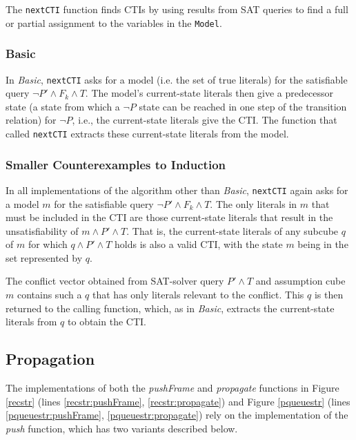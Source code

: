 \documentclass[12pt,a4paper,twoside,openright]{report}
\begin{document}
{{The \verb,nextCTI, function finds CTIs by
using results from SAT queries to find a full or partial assignment to
the variables in the \verb,Model,.

\subsubsection{Basic}
In \emph{Basic}, \verb,nextCTI, asks for a model
(i.e. the set of true literals) for the satisfiable query $\neg P' \wedge F_k \wedge T$.
The model's current-state literals then give a predecessor state (a state from which
a $\neg P$ state can be reached in one step of the transition relation) for $\neg P$,
i.e., the current-state literals give the CTI.
The function that called \verb,nextCTI, extracts these current-state literals from the model.

\subsubsection{Smaller Counterexamples to Induction}
In all implementations of the algorithm other than {\it Basic},
\verb,nextCTI, again asks for a model $m$
for the satisfiable query $\neg P' \wedge F_k \wedge T$. The only literals in $m$ that
must be included in the CTI are those current-state literals that result in
the unsatisfiability of $m \wedge P' \wedge T$. That is, the current-state literals of any
subcube $q$ of $m$ for which $q \wedge P' \wedge T$ holds is also a valid CTI, with
the state $m$ being in the set represented by $q$.

The conflict vector obtained from SAT-solver query $P' \wedge T$ and assumption
cube $m$ contains such a $q$ that has only literals relevant to the conflict. This $q$ is
then returned to the calling function, which, as in \emph{Basic}, extracts
the current-state literals from $q$ to obtain the CTI.


\subsection{Propagation}
\label{impl:propagation}
The implementations of both the {\it pushFrame} and {\it propagate} functions
in Figure \ref{recstr} (lines \ref{recstr:pushFrame},
\ref{recstr:propagate}) and
Figure \ref{pqueuestr} (lines \ref{pqueuestr:pushFrame}, \ref{pqueuestr:propagate})
rely on the implementation of the
{\it push} function, which has two variants described below.

}}
\end{document}
